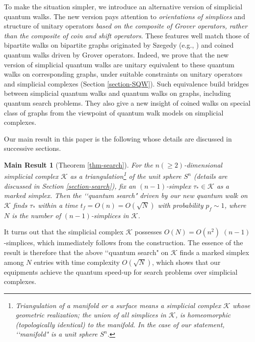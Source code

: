 \documentclass[a4paper,12pt]{article}
\newtheorem*{main}{Main Result}
\numberwithin{equation}{section}
\begin{document}
To make the situation simpler, we introduce an alternative version of simplicial quantum walks.
The new version pays attention to {\em orientations of simplices} and structure of unitary operators {\em based on the composite of Grover operators, rather than the composite of coin and shift operators}.
These features well match those of bipartite walks on bipartite graphs originated by Szegedy (e.g., \cite{Sze}) and coined quantum walks driven by Grover operators.
Indeed, we prove that the new version of simplicial quantum walks are unitary equivalent to these quantum walks on corresponding graphs, under suitable constraints on unitary operators and simplicial complexes (Section \ref{section-SQW}).
Such equivalence build bridges between simplicial quantum walks and quantum walks on graphs, including quantum search problems.
They also give a new insight of coined walks on special class of graphs from the viewpoint of quantum walk models on simplicial complexes.
\par
Our main result in this paper is the following whose details are discussed in successive sections.
%
\begin{main}[Theorem \ref{thm-search}]
For the $n(\geq 2)$-dimensional simplicial complex $\mathcal{K}$ as a triangulation\footnote{
Triangulation of a manifold or a surface means a simplicial complex $\mathcal{K}$ whose geometric realization; the union of all simplices in $\mathcal{K}$, is homeomorphic (topologically identical) to the manifold.
In the case of our statement, \lq\lq manifold" is a unit sphere $S^n$.
}
of the unit sphere $S^n$ (details are discussed in Section \ref{section-search}), fix an $(n-1)$-simplex $\tau_\ast \in \mathcal{K}$ as a marked simplex. 
Then the \lq\lq quantum search" driven by our new quantum walk on $\mathcal{K}$ finds $\tau_\ast$ within a time $t_f=O(n) = O(\sqrt{N})$ with probability $p_f\sim 1$, where $N$ is the number of $(n-1)$-simplices in $\mathcal{K}$. 
\end{main}
%
It turns out that the simplicial complex $\mathcal{K}$ possesses $O(N) = O(n^2)$ $(n-1)$-simplices, which immediately follows from the construction.
The essence of the result is therefore that the above \lq\lq quantum search" on $\mathcal{K}$ finds a marked simplex among $N$ entries with time complexity $O(\sqrt{N})$, which shows that our equipments achieve the quantum speed-up for search problems over simplicial complexes.
\end{document}
